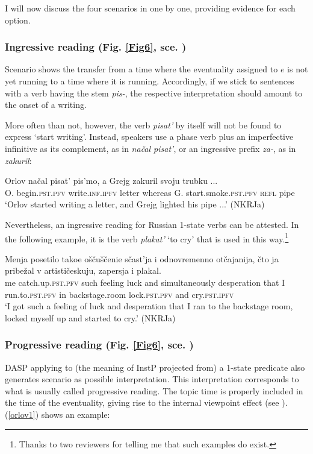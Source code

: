 \documentclass[output=paper,colorlinks,citecolor=brown]{langscibook}
\begin{document}
 
I will now discuss the four scenarios in  one by one, providing evidence for each option.  


\subsubsection{Ingressive reading (Fig. \ref{Fig6}, sce. )}\label{ingr}
Scenario  shows the transfer from a time where the eventuality assigned to $e$ is not yet running to a time where it is running.
Accordingly, if we stick to sentences with a verb having the stem \textit{pis-}, the respective interpretation 
should amount to the onset of a writing. 

More often than not, however, the verb \textit{pisat'} by itself will not be found to express `start writing'. 
Instead, speakers use a phase verb plus an imperfective infinitive as its complement, as in \textit{načal pisat'}, or an ingressive prefix \textit{za-}, as in \textit{zakuril}:

\ea\label{orlov}
\gll Orlov načal pisat' pis'mo, a Grejg
zakuril svoju trubku ... \\
O. begin.\textsc{pst.pfv} write.\textsc{inf.ipfv} letter whereas G. 
start.smoke.\textsc{pst.pfv} 
\textsc{refl} pipe  \\
\glt `Orlov started writing a letter, and Grejg lighted his pipe ...' \hfill (NKRJa)
\z

\noindent Nevertheless, an ingressive reading for 
Russian 1-state verbs 
can be attested. In the following example, it is the verb 
\textit{plakat'} `to cry' that is used in this way.\footnote{Thanks to two reviewers for telling me that such examples do exist.} 

\ea\label{plakal}
\gll Menja posetilo takoe oščuščenie sčast'ja i
odnovremenno otčajanija, čto ja pribežal v artističeskuju, zapersja i  plakal.\\
me catch.up.\textsc{pst.pfv} such feeling luck and simultaneously 
desperation 
that I run.to.\textsc{pst.pfv} in backstage.room lock.\textsc{pst.pfv} 
and cry.\textsc{pst.ipfv} \\
\glt `I got such a feeling of luck and desperation that I ran to the backstage room, locked myself up and started to cry.' \hfill (NKRJa)
\z


\subsubsection{Progressive reading (Fig. \ref{Fig6}, sce. )}
DASP applying to (the meaning of InstP projected from) a 1-state predicate also generates scenario  as possible interpretation. 
This interpretation corresponds to what is usually called progressive reading.
The topic time is properly included in the time of the eventuality, giving rise to the internal viewpoint effect (see \citealt{Smith1991}). 
(\ref{orlov1}) shows an example:
\end{document}
